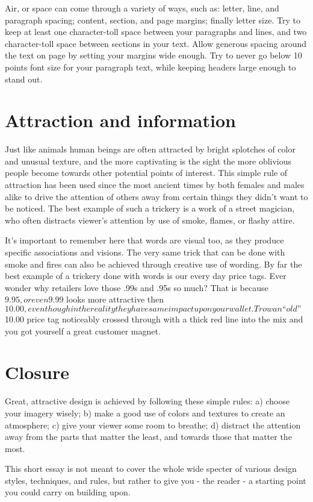 Air, or space can come through a variety of ways, such as: letter, line, and paragraph spacing; content, section, and page margins; finally letter size. Try to keep at least one character-toll space between your paragraphs and lines, and two character-toll space between sections in your text. Allow generous spacing around the text on page by setting your margins wide enough. Try to never go below 10 points font size for your paragraph text, while keeping headers large enough to stand out.

\section*{Attraction and information}

Just like animals human beings are often attracted by bright splotches of color and unusual texture, and the more captivating is the sight the more oblivious people become towards other potential points of interest. This simple rule of attraction has been used since the most ancient times by both females and males alike to drive the attention of others away from certain things they didn’t want to be noticed. The best example of such a trickery is a work of a street magician, who often distracts viewer’s attention by use of smoke, flames, or flashy attire.

It’s important to remember here that words are visual too, as they produce specific associations and visions. The very same trick that can be done with smoke and fires can also be achieved through creative use of wording. By far the best example of a trickery done with words is our every day price tags. Ever wonder why retailers love those .99s and .95s so much? That is because $9.95, or even $9.99 looks more attractive then $10.00, even though in the reality they have same impact upon your wallet. Trow an “old” $10.00 price tag noticeably crossed through with a thick red line into the mix and you got yourself a great customer magnet.

\section*{Closure}

Great, attractive design is achieved by following these simple rules: a) choose your imagery wisely; b) make a good use of colors and textures to create an atmosphere; c) give your viewer some room to breathe; d) distract the attention away from the parts that matter the least, and towards those that matter the most.

This short essay is not meant to cover the whole wide specter of various design styles, techniques, and rules, but rather to give you - the reader - a starting point you could carry on building upon.
